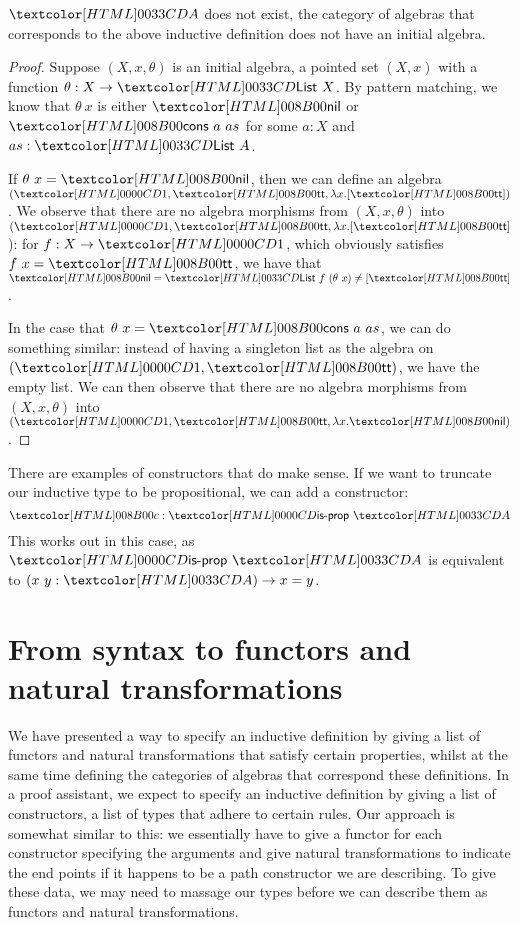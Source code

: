 \begin{proposition}
  $\Aty$ does not exist, \ie the category of algebras that corresponds
  to the above inductive definition does not have an initial algebra.
\end{proposition}

\begin{proof}
  Suppose $(X,x,\theta)$ is an initial algebra, \ie a pointed set
  $(X,x)$ with a function $\theta : X \to \List\ X$. By pattern
  matching, we know that $\theta\ x$ is either $\listnil$ or
  $\listcons\ a\ as$ for some $a : X$ and $as : \List\ A$.

  If $\theta\ x = \listnil$, then we can define an algebra
  $(\unitty, \unitval, \lambda x . [ \unitval ])$. We observe that there are no
  algebra morphisms from $(X,x,\theta)$ into
  $(\unitty, \unitval, \lambda x . [ \unitval ]$): for $f : X \to \unitty$, which
  obviously satisfies $f\ x = \unitval$, we have that
  $\listnil = \List\ f\ (\theta\ x) \neq [ \unitval ]$.

  In the case that $\theta\ x = \listcons\ a\ as$, we can do something
  similar: instead of having a singleton list as the algebra on
  $(\unitty, \unitval)$, we have the empty list. We can then observe
  that there are no algebra morphisms from $(X,x,\theta)$ into
  $(\unitty, \unitval, \lambda x . \listnil)$.
\end{proof}

There are examples of constructors that do make sense. If we want to
truncate our inductive type to be propositional, we can add a
constructor:
$$
\Ac : \isprop\ \Aty
$$
This works out in this case, as $\isprop\ \Aty$ is equivalent to
$(x\ y : \Aty) \to x = y$. 

\section{From syntax to functors and natural transformations}
\label{from-syntax-to-functors}

We have presented a way to specify an inductive definition by giving a
list of functors and natural transformations that satisfy certain
properties, whilst at the same time defining the categories of
algebras that correspond these definitions. In a proof assistant, we
expect to specify an inductive definition by giving a list of
constructors, \ie a list of types that adhere to certain rules. Our
approach is somewhat similar to this: we essentially have to give a
functor for each constructor specifying the arguments and give natural
transformations to indicate the end points if it happens to be a path
constructor we are describing. To give these data, we may need to
massage our types before we can describe them as functors and natural
transformations.

